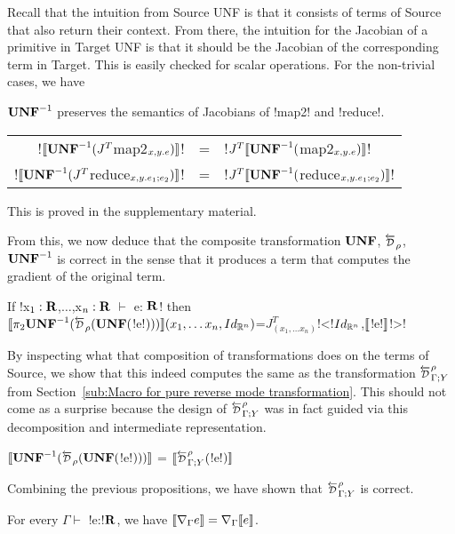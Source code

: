 Recall that the intuition from Source UNF is that it consists of terms of Source that also return their context.
From there, the intuition for the Jacobian of a primitive in Target UNF is that it should be the Jacobian of
the corresponding term in Target. This is easily checked for scalar operations. 
For the non-trivial cases, we have 

\begin{proposition}
$\mathbf{UNF}^{-1}$ preserves the semantics of Jacobians of !map2! and !reduce!.
    \begin{center}
\begin{tabular}{r c l}
    !$\llbracket\mathbf{UNF}^{-1}(J^T$map2$_{x,y.e})\rrbracket$! &=& !$J^T\llbracket\mathbf{UNF}^{-1}($map2$_{x,y.e})\rrbracket$!\\
    !$\llbracket\mathbf{UNF}^{-1}(J^T$reduce$_{x,y.e_1;e_2})\rrbracket$! &=& !$J^T\llbracket\mathbf{UNF}^{-1}($reduce$_{x,y.e_1;e_2})\rrbracket$!
\end{tabular}
\end{center}
\end{proposition}

This is proved in the supplementary material.

From this, we now deduce that the composite transformation $\mathbf{UNF}$, $\Dsynrevsymbol_{\rho}$, $\mathbf{UNF}^{-1}$ is correct
in the sense that it produces a term that computes the gradient of the original term.

\begin{proposition}
    If !x$_1:\mathbf{R}$,$\ldots$,x$_n:\mathbf{R}$ $\vdash$ e: $\mathbf{R}$! then \\
    $\seml \pi_2 \UNFSymbol^{-1}(\Dsynrevsymbol_{\rho}(\UNFSymbol($!e!$)))\rrbracket(x_1,\ldots x_n,Id_{\mathbb{R}^n})$=$J^T_{(x_1,\ldots x_n)}$!<!$Id_{\mathbb{R}^n}$,$\llbracket$!e!$\rrbracket$!>!
\end{proposition}

By inspecting what that composition of transformations does on the terms of Source, 
we show that this indeed computes the same as the transformation 
$\directD{\rho}{\Gamma}{Y}$ from Section~\ref{sub:Macro for pure reverse mode transformation}. 
This should not come as a surprise because the design of $\directD{\rho}{\Gamma}{Y}$ was in fact guided via 
this decomposition and intermediate representation.

\begin{proposition}
    $\seml\UNFSymbol^{-1}(\Dsynrevsymbol_{\rho}(\UNFSymbol($!e!$)))\rrbracket$ = $\seml\directD{\rho}{\Gamma}{Y}($!e!$)\rrbracket$ 
\end{proposition}

Combining the previous propositions, we have shown that $\directD{\rho}{\Gamma}{Y}$ is correct.

\begin{theorem}
    For every $\Gamma \vdash$ !e:!$\mathbf{R}$, we have 
    $\llbracket \nabla_\Gamma e\rrbracket= \nabla_\Gamma\llbracket e\rrbracket$.
\end{theorem}